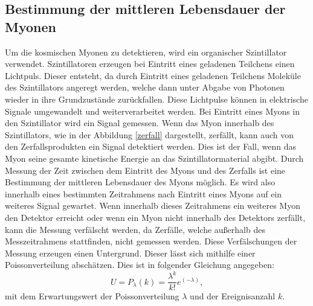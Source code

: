 \subsection{Bestimmung der mittleren Lebensdauer der Myonen}
\label{subsec:BestimmungLebensdauer}
Um die kosmischen Myonen zu detektieren, wird ein organischer Szintillator verwendet.
Szintillatoren erzeugen bei Eintritt eines geladenen Teilchens einen Lichtpuls.
Dieser entsteht, da durch Eintritt eines geladenen Teilchens Moleküle des Szintillators
angeregt werden, welche dann unter Abgabe von Photonen wieder in ihre Grundzustände zurückfallen.
Diese Lichtpulse können in elektrische Signale umgewandelt und weiterverarbeitet werden.
Bei Eintritt eines Myons in den Szintillator wird ein Signal gemessen. Wenn das Myon innerhalb
des Szintillators, wie in der Abbildung \ref{zerfall} dargestellt, zerfällt, kann auch von den Zerfallsprodukten
ein Signal detektiert werden. Dies ist der Fall, wenn das Myon seine gesamte kinetische Energie
an das Szintillatormaterial abgibt.
Durch Messung der Zeit zwischen dem Eintritt des Myons und des
Zerfalls ist eine Bestimmung der mittleren Lebensdauer des Myons möglich. Es wird also
innerhalb eines bestimmten Zeitrahmens nach Eintritt eines Myons auf ein weiteres Signal
gewartet. Wenn innerhalb dieses Zeitrahmens ein weiteres Myon den Detektor erreicht oder wenn
ein Myon nicht innerhalb des Detektors zerfällt, kann die Messung verfälscht werden, da
Zerfälle, welche außerhalb des Messzeitrahmens stattfinden, nicht gemessen werden.
Diese Verfälschungen der Messung erzeugen einen Untergrund. Dieser lässt sich mithilfe
einer Poissonverteilung abschätzen. Dies ist in folgender Gleichung angegeben:
\begin{equation}
  U = P_{\lambda} (k) = \frac{\lambda^{k}}{k!} e^{(-\lambda)},
  \label{eqn:Untergrundrate}
\end{equation}
\noindent
mit dem Erwartungswert der Poissonverteilung $\lambda$ und der Ereignisanzahl $k$.
